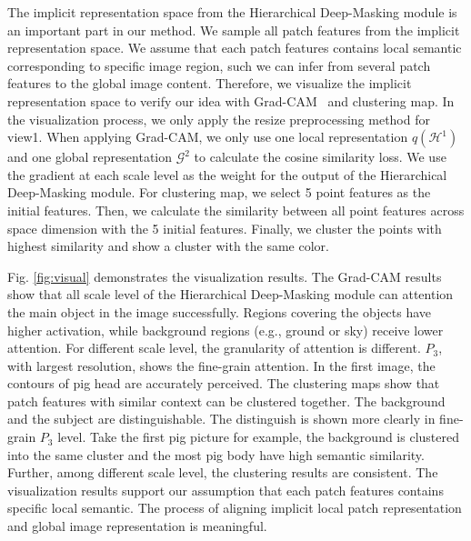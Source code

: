 \documentclass[10pt,twocolumn,letterpaper]{article}
\begin{document}
The implicit representation space from the Hierarchical Deep-Masking module is an important part in our method. We sample all patch features from the implicit representation space. We assume that each patch features contains local semantic corresponding to specific image region, such we can infer from several patch features to the global image content. Therefore, we visualize the implicit representation space to verify our idea with Grad-CAM~\cite{selvaraju2017grad} and clustering map. In the visualization process, we only apply the resize preprocessing method for view1. When applying Grad-CAM, we only use one local representation $q(\mathcal{H}^1)$ and one global representation $\mathcal{G}^2$ to calculate the cosine similarity loss. We use the gradient at each scale level as the weight for the output of the Hierarchical Deep-Masking module. For clustering map, we select 5 point features as the initial features. Then, we calculate the similarity between all point features across space dimension with the 5 initial features. Finally, we cluster the points with highest similarity and show a cluster with the same color.

Fig. \ref{fig:visual} demonstrates the visualization results.
The Grad-CAM results show that all scale level of the Hierarchical Deep-Masking module can attention the main object in the image successfully. Regions covering the objects have higher activation, while background regions (e.g., ground or sky) receive lower attention. For different scale level, the granularity of attention is different. $P_3$, with largest resolution, shows the fine-grain attention. In the first image, the contours of pig head are accurately perceived.
The clustering maps show that patch features with similar context can be clustered together. The background and the subject are distinguishable. The distinguish is shown more clearly in fine-grain $P_3$ level. Take the first pig picture for example, the background is clustered into the same cluster and the most pig body have high semantic similarity.
Further, among different scale level, the clustering results are consistent. The visualization results support our assumption that each patch features contains specific local semantic. The process of aligning implicit local patch representation and global image representation is meaningful.
\end{document}
